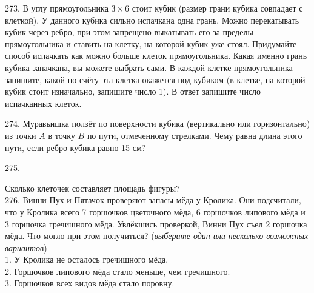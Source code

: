 \begin{center}
\begin{figure}[ht!]
\end{figure}
\end{center}
273. В углу прямоугольника $3\times6$ стоит кубик (размер грани кубика совпадает с клеткой). У данного кубика сильно испачкана одна грань. Можно перекатывать кубик через ребро, при этом запрещено выкатывать его за пределы прямоугольника и ставить на клетку, на которой кубик уже стоял. Придумайте способ испачкать как можно больше клеток прямоугольника. Какая именно грань кубика запачкана, вы можете выбрать сами. В каждой клетке прямоугольника запишите, какой по счёту эта клетка окажется под кубиком (в клетке, на которой кубик стоит изначально, запишите число 1). В ответ запишите число испачканных клеток.
\begin{center}
\begin{figure}[ht!]
\end{figure}
\end{center}
274. Муравьишка ползёт по поверхности кубика (вертикально или горизонтально) из точки $A$ в точку $B$ по пути, отмеченному стрелками. Чему равна длина этого пути, если ребро кубика равно 15 см?
\begin{center}
\begin{figure}[ht!]
\end{figure}
\end{center}
275. \begin{center}
\begin{figure}[ht!]
\end{figure}
\end{center}
Сколько клеточек составляет площадь фигуры?\\
276. Винни Пух и Пятачок проверяют запасы мёда у Кролика. Они подсчитали, что у Кролика всего 7 горшочков цветочного мёда, 6 горшочков липового мёда и 3 горшочка гречишного мёда. Увлёкшись проверкой, Винни Пух съел 2 горшочка мёда. Что могло при этом получиться? ({\it выберите один или несколько возможных вариантов})\\
1. У Кролика не осталось гречишного мёда.\\
2. Горшочков липового мёда стало меньше, чем гречишного.\\
3. Горшочков всех видов мёда стало поровну.\\

